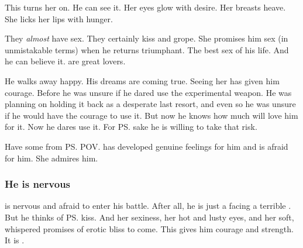 \begin{garbage}
This turns her on. 
He can see it. 
Her eyes glow with desire. 
Her breasts heave. 
She licks her lips with hunger. 

They \emph{almost} have sex. 
They certainly kiss and grope. 
She promises him sex (in unmistakable terms) when he returns triumphant. 
The best sex of his life. 
And he can believe it. 
\Resviel{} are great lovers. 

He walks away happy. 
His dreams are coming true. 
Seeing her has given him courage. 
Before he was unsure if he dared use the experimental weapon. 
He was planning on holding it back as a desperate last resort, and even so he was unsure if he would have the courage to use it. 
But now he knows how much \Firaxel{} will love him for it. 
Now he dares use it. 
For \ps{\Firaxel} sake he is willing to take that risk. 

Have some from \ps{\Firaxel} POV. 
\Firaxel{} has developed genuine feelings for him and is afraid for him. 
She admires him. 

\begin{prose}
\end{prose}






\subsubsection{He is nervous}
\Teshrial{} is nervous and afraid to enter his battle. 
After all, he is just a \ketheran{} facing a terrible \shaeeroth. 
But he thinks of \ps{\Firaxel} kiss. 
And her sexiness, her hot and lusty eyes, and her soft, whispered promises of erotic bliss to come. 
This gives him courage and strength. 
It is . 


\end{garbage}
